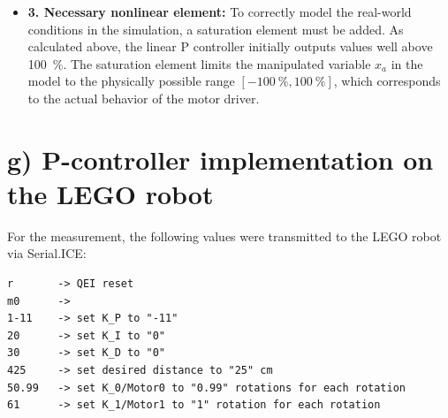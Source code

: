 \documentclass[12pt, oneside, a4paper]{scrreprt}
\begin{document}
\begin{itemize}
                \item \textbf{3. Necessary nonlinear element:} To correctly model the real-world conditions in the simulation, a saturation element must be added. As calculated above, the linear P controller initially outputs values well above \qty{100}{\percent}. The saturation element limits the manipulated variable $x_a$ in the model to the physically possible range $[\qty{-100}{\percent}, \qty{100}{\percent}]$, which corresponds to the actual behavior of the motor driver.
            \end{itemize}



        \section{g) P-controller implementation on the LEGO robot}\label{sec:g-}

            \label{task(g)}

            For the measurement, the following values were transmitted to the LEGO robot via Serial.ICE:

            \begin{lstlisting}[caption={Serial.ICE commands sent to the robot}, label={lst:serial-ice-commands}]
r       -> QEI reset
m0      ->
1-11    -> set K_P to "-11"
20      -> set K_I to "0"
30      -> set K_D to "0"
425     -> set desired distance to "25" cm
50.99   -> set K_0/Motor0 to "0.99" rotations for each rotation
61      -> set K_1/Motor1 to "1" rotation for each rotation
            \end{lstlisting}
\end{document}
